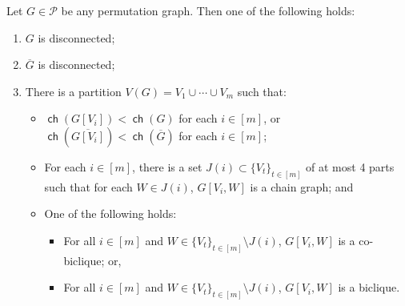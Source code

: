 \documentclass{article}
\newcommand{\cP}{\ensuremath{\mathcal{P}}}
\DeclareMathOperator\ch{\mathsf{ch}}
\begin{document}
\begin{lemma}
	\label{lemma:permutation decomposition}
	Let $G \in \cP$ be any permutation graph. Then one of the following holds:
	\begin{enumerate}[label=\textup{(\arabic*)}]
		\item $G$ is disconnected;
		\item $\overline G$ is disconnected;
		\item There is a partition $V(G) = V_1 \cup \dotsm \cup V_m$ such that:
		\begin{itemize}
			\item $\ch(G[V_i]) < \ch(G)$ for each $i \in [m]$, or $\ch(\overline{G[V_i]}) < \ch(\overline G)$ for each $i \in [m]$;
			\item For each $i \in [m]$, there is a set $J(i) \subset \{ V_t \}_{t \in [m]}$ of at most 4 parts such that
			for each $W \in J(i)$, $G[V_i,W]$ is a chain graph; and
			\item One of the following holds:
			\begin{itemize}
				\item For all $i \in [m]$ and $W \in \{V_t\}_{t \in [m]} \setminus J(i)$, $G[V_i,W]$ is a
				co-biclique; or,
				\item For all $i \in [m]$ and $W \in \{V_t\}_{t \in [m]} \setminus J(i)$, $G[V_i,W]$ is a
				biclique.
			\end{itemize}
		\end{itemize}
	\end{enumerate}
\end{lemma}
\end{document}
